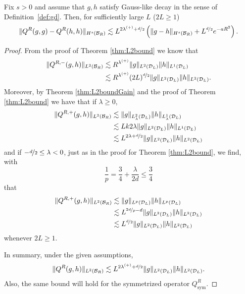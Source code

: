 \begin{lemma} \label{lem:lipschitz} Fix $s>0$ and assume that $g,h$ satisfy
  Gauss-like decay in the sense of Definition~\ref{def:gd}.  Then, for
    sufficiently large $L$ ($2L\geq1$)
    \[
    \|Q^R(g,g) - Q^R(h,h)\|_{H^s(\mathcal{B}_R)} \lesssim
    L^{2\lambda^{(+)}+\nicefrac{d}{2}}\left(\|g-h\|_{H^s(\mathcal{B}_R)} +
      L^{\nicefrac{d}{2}}e^{-aR^2}\right).
    \]
\end{lemma}
\begin{proof}
    From the proof of Theorem \ref{thm:L2bound} we know that
    \begin{align*}
        \|Q^{R,-}(g,h)\|_{L^2(\mathcal{B}_R)} & \lesssim R^{\lambda^{(+)}}
                \|g\|_{L^2(\mathcal{D}_L)}\|h\|_{L^1(\mathcal{D}_L)} \\
        & \lesssim R^{\lambda^{(+)}}
                (2L)^{\nicefrac{d}{2}} \|g\|_{L^2(\mathcal{D}_L)}\|h\|_{L^2(\mathcal{D}_L)}.
    \end{align*}
    Moreover, by Theorem \ref{thm:L2boundGain} and the proof of Theorem
    \ref{thm:L2bound} we have that if $\lambda\geq0$,
    \begin{align*}
        \|Q^{R,+}(g,h)\|_{L^2(\mathcal{B}_R)} & \lesssim
                \|g\|_{L^2_\lambda(\mathcal{D}_L)} \|h\|_{L^1_\lambda(\mathcal{D}_L)} \\
        & \lesssim Lk{2\lambda} \|g\|_{L^2(\mathcal{D}_L)} \|h\|_{L^1(\mathcal{D}_L)} \\
        & \lesssim L^{2\lambda+\nicefrac{d}{2}}
                \|g\|_{L^2(\mathcal{D}_L)} \|h\|_{L^2(\mathcal{D}_L)}
    \end{align*}
    and if $-\nicefrac{d}{2}\leq\lambda<0$, just as in the proof for Theorem
    \ref{thm:L2bound}, we find, with
    \[
        \frac{1}{p} = \frac{3}{4} + \frac{\lambda}{2d} \leq \frac{3}{4}
    \]
    that
    \begin{align*}
        \|Q^{R,+}(g,h)\|_{L^2(\mathcal{B}_R)} & \lesssim
                \|g\|_{L^p(\mathcal{D}_L)} \|h\|_{L^p(\mathcal{D}_L)} \\
        & \lesssim L^{\nicefrac{2d}{p}-d}
                \|g\|_{L^2(\mathcal{D}_L)}\|h\|_{L^2(\mathcal{D}_L)} \\
        & \lesssim L^{\nicefrac{d}{2}} \|g\|_{L^2(\mathcal{D}_L)}\|h\|_{L^2(\mathcal{D}_L)}
    \end{align*}
    whenever $2L\geq1$.

    In summary, under the given assumptions,
    \[ 
        \|Q^R(g,h)\|_{L^2(\mathcal{B}_R)} \lesssim
        L^{2\lambda^{(+)}+\nicefrac{d}{2}} \|g\|_{L^2(\mathcal{D}_L)} \|h\|_{L^2(\mathcal{D}_L)}.
    \]
    Also, the same bound will hold for the symmetrized operator
    $Q_{\mathrm{sym}}^R$.


\end{proof}
